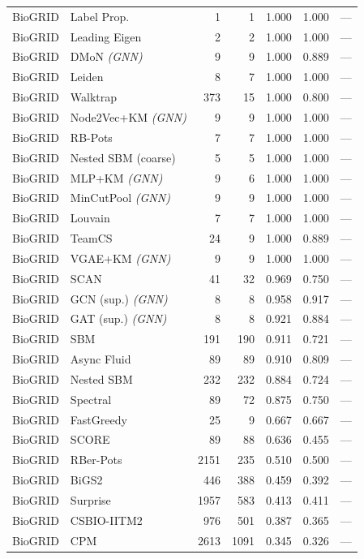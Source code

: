 \begin{longtable}{llrrrrr}
BioGRID & Label Prop. & 1 & 1 & 1.000 & 1.000 & --- \\
BioGRID & Leading Eigen & 2 & 2 & 1.000 & 1.000 & --- \\
BioGRID & DMoN \textit{(GNN)} & 9 & 9 & 1.000 & 0.889 & --- \\
BioGRID & Leiden & 8 & 7 & 1.000 & 1.000 & --- \\
BioGRID & Walktrap & 373 & 15 & 1.000 & 0.800 & --- \\
BioGRID & Node2Vec+KM \textit{(GNN)} & 9 & 9 & 1.000 & 1.000 & --- \\
BioGRID & RB-Pots & 7 & 7 & 1.000 & 1.000 & --- \\
BioGRID & Nested SBM (coarse) & 5 & 5 & 1.000 & 1.000 & --- \\
BioGRID & MLP+KM \textit{(GNN)} & 9 & 6 & 1.000 & 1.000 & --- \\
BioGRID & MinCutPool \textit{(GNN)} & 9 & 9 & 1.000 & 1.000 & --- \\
BioGRID & Louvain & 7 & 7 & 1.000 & 1.000 & --- \\
BioGRID & TeamCS & 24 & 9 & 1.000 & 0.889 & --- \\
BioGRID & VGAE+KM \textit{(GNN)} & 9 & 9 & 1.000 & 1.000 & --- \\
BioGRID & SCAN & 41 & 32 & 0.969 & 0.750 & --- \\
BioGRID & GCN (sup.) \textit{(GNN)} & 8 & 8 & 0.958 & 0.917 & --- \\
BioGRID & GAT (sup.) \textit{(GNN)} & 8 & 8 & 0.921 & 0.884 & --- \\
BioGRID & SBM & 191 & 190 & 0.911 & 0.721 & --- \\
BioGRID & Async Fluid & 89 & 89 & 0.910 & 0.809 & --- \\
BioGRID & Nested SBM & 232 & 232 & 0.884 & 0.724 & --- \\
BioGRID & Spectral & 89 & 72 & 0.875 & 0.750 & --- \\
BioGRID & FastGreedy & 25 & 9 & 0.667 & 0.667 & --- \\
BioGRID & SCORE & 89 & 88 & 0.636 & 0.455 & --- \\
BioGRID & RBer-Pots & 2151 & 235 & 0.510 & 0.500 & --- \\
BioGRID & BiGS2 & 446 & 388 & 0.459 & 0.392 & --- \\
BioGRID & Surprise & 1957 & 583 & 0.413 & 0.411 & --- \\
BioGRID & CSBIO-IITM2 & 976 & 501 & 0.387 & 0.365 & --- \\
BioGRID & CPM & 2613 & 1091 & 0.345 & 0.326 & --- \\

\end{longtable}
